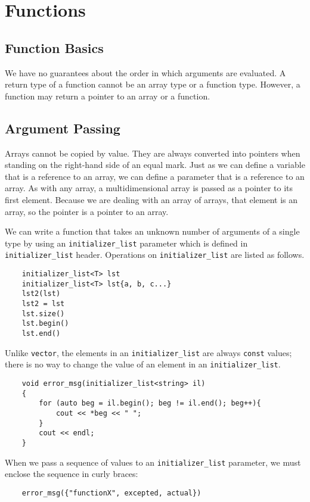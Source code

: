 \documentclass[11pt]{ctexart}
\begin{document}
\section{Functions}
\subsection{Function Basics}
\par We have no guarantees about the order in which arguments are evaluated. A return type of a function cannot be an array type or a function type. However, a function may return a pointer to an array or a function.
\subsection{Argument Passing}
\par Arrays cannot be copied by value. They are always converted into pointers when standing on the right-hand side of an equal mark. Just as we can define a variable that is a reference to an array, we can define a parameter that is a reference to an array. As with any array, a multidimensional array is passed as a pointer to its first element. Because we are dealing with an array of arrays, that element is an array, so the pointer is a pointer to an array.
\par We can write a function that takes an unknown number of arguments of a single type by using an \verb|initializer_list| parameter which is defined in \verb|initializer_list| header. Operations on \verb|initializer_list| are listed as follows.
\begin{lstlisting}
    initializer_list<T> lst
    initializer_list<T> lst{a, b, c...}
    lst2(lst)
    lst2 = lst
    lst.size()
    lst.begin()
    lst.end()
\end{lstlisting}
\par Unlike \verb|vector|, the elements in an \verb|initializer_list| are always \verb|const| values; there is no way to change the value of an element in an \verb|initializer_list|.
\begin{lstlisting}
    void error_msg(initializer_list<string> il)
    {
        for (auto beg = il.begin(); beg != il.end(); beg++){
            cout << *beg << " ";
        }
        cout << endl;
    }
\end{lstlisting}
\par When we pass a sequence of values to an \verb|initializer_list| parameter, we must enclose the sequence in curly braces:
\begin{lstlisting}
    error_msg({"functionX", excepted, actual})
\end{lstlisting}
\end{document}

